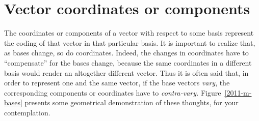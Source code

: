 \section{Vector coordinates or components}
The coordinates or components of a vector with respect to some basis
represent the coding of that vector in that particular basis.
It is important to realize that, as bases change, so do coordinates.
Indeed, the changes in coordinates have to ``compensate'' for the bases change,
because the same coordinates in a different basis would render an altogether different
vector.
Thus it is often said that, in order to represent one and the same vector,
if the base vectors {\em vary}, the corresponding components or coordinates have to {\em contra-vary.}
Figure~\ref{2011-m-bases} presents some geometrical demonstration of
these thoughts, for your contemplation.

